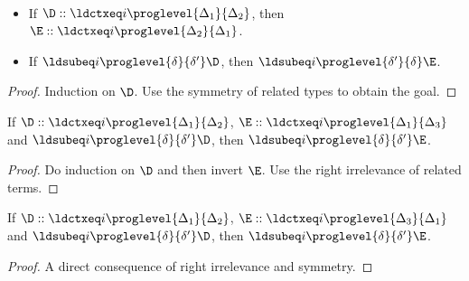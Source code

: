 \begin{lemma}[Symmetry] $ $
  \begin{itemize}
  \item If $\D :: \ldctxeq i \proglevel{\Delta_1}{\Delta_2}$, then $\E :: \ldctxeq i \proglevel{\Delta_2}{\Delta_1}$.
  \item If $\ldsubeq i \proglevel{\delta}{\delta'}\D$, then $\ldsubeq i \proglevel{\delta'}{\delta}\E$.
  \end{itemize}  
\end{lemma}
\begin{proof}
  Induction on $\D$. %
  Use the symmetry of related types to obtain the goal.
\end{proof}

\begin{lemma}
  If $\D :: \ldctxeq i \proglevel{\Delta_1}{\Delta_2}$, $\E :: \ldctxeq i
  \proglevel{\Delta_1}{\Delta_3}$ and $\ldsubeq i \proglevel{\delta}{\delta'}\D$, then
  $\ldsubeq i \proglevel{\delta}{\delta'}\E$.
\end{lemma}
\begin{proof}
  Do induction on $\D$ and then invert $\E$. %
  Use the right irrelevance of related terms. %
\end{proof}

\begin{lemma}
  If $\D :: \ldctxeq i \proglevel{\Delta_1}{\Delta_2}$, $\E :: \ldctxeq i
  \proglevel{\Delta_3}{\Delta_1}$ and $\ldsubeq i \proglevel{\delta}{\delta'}\D$, then
  $\ldsubeq i \proglevel{\delta}{\delta'}\E$.
\end{lemma}
\begin{proof}
   A direct consequence of right irrelevance and symmetry. 
\end{proof}


